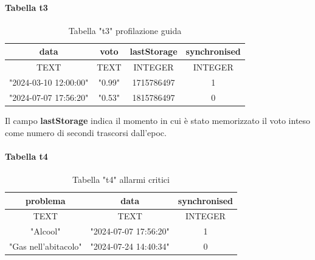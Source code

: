 \documentclass[12pt, a4paper, italian]{report}
\numberwithin{figure}{chapter}
\numberwithin{table}{chapter}
\begin{document}
\paragraph{Tabella t3}
\begin{table}[h!]
  \centering 
  \begin{adjustbox}{max width=\textwidth}
    \begin{tabular}{|c|c|c|c|}
      \hline
      \textbf{data} & \textbf{voto} & \textbf{lastStorage} & \textbf{synchronised} \\
      \hline
      TEXT & TEXT & INTEGER & INTEGER \\
      \hline
      "2024-03-10 12:00:00" & "0.99" & 1715786497 & 1 \\
      \hline
      "2024-07-07 17:56:20" & "0.53" & 1815786497 & 0 \\
      \hline
    \end{tabular}
  \end{adjustbox}
  \caption{Tabella "t3" profilazione guida}
  \label{tab:t3 profilazione}
\end{table}
Il campo \textbf{lastStorage} indica il momento in cui è stato memorizzato il voto inteso come numero di secondi trascorsi dall'epoc.

\paragraph{Tabella t4}
\begin{table}[h!]
  \centering 
  \begin{adjustbox}{max width=\textwidth}
    \begin{tabular}{|c|c|c|}
      \hline
      \textbf{problema} & \textbf{data} & \textbf{synchronised} \\
      \hline
      TEXT & TEXT & INTEGER \\
      \hline
      "Alcool" & "2024-07-07 17:56:20" & 1 \\
      \hline
      "Gas nell'abitacolo" & "2024-07-24 14:40:34" & 0   \\
      \hline
    \end{tabular}
  \end{adjustbox}
  \caption{Tabella "t4" allarmi critici}
  \label{tab:t4 allarmi critici}
\end{table}
\end{document}
